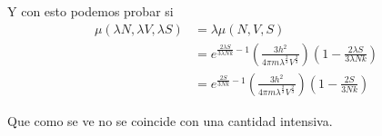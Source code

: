 \documentclass{report}
\begin{document}
Y con esto podemos probar si
\begin{align*}
  \mu\left(\lambda N, \lambda V, \lambda S\right) &= \lambda \mu \left(N, V, S\right)\\
  &= e^{\frac{2\lambda S}{3\lambda Nk} -1} \left(\frac{3h^2}{4 \pi m \lambda^{\frac{2}{3}}V^{\frac{2}{3}}}\right)\left(1 -\frac{2\lambda S}{3\lambda N k} \right)\\
  &= e^{\frac{2S}{3Nk} -1} \left(\frac{3h^2}{4 \pi m \lambda^{\frac{2}{3}}V^{\frac{2}{3}}}\right)\left(1 -\frac{2S}{3N k} \right)
\end{align*}

Que como se ve no se coincide con una cantidad intensiva.

\section{}
\section{}

\chapter{}

\chapter{}

\section{}
\section{}
\section{}

\chapter{}

\section{}
\section{}
\end{document}
